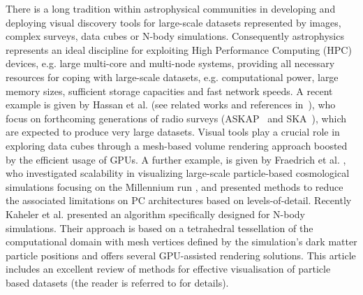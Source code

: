 \documentclass[1p]{elsarticle}
\begin{document}
There is a long tradition within astrophysical communities in developing and deploying visual discovery tools for large-scale datasets represented by images, complex surveys, data cubes or N-body simulations. Consequently astrophysics represents an ideal discipline for exploiting High Performance Computing (HPC) devices, e.g. large multi-core and multi-node systems, providing all necessary resources for coping with large-scale datasets, e.g. computational power, large memory sizes, sufficient storage capacities and fast network speeds. A recent example is given by Hassan et al. (see related works and references in~\cite{2012ASPC..461...45H}), who focus on forthcoming generations of radio surveys (ASKAP~\cite{askap} and SKA~\cite{ska}), which are expected to produce very large datasets. Visual tools play a crucial role in exploring data cubes through a mesh-based volume rendering approach boosted by the efficient usage of GPUs. A further example, is given by Fraedrich et al. \cite{Fraedrich:2009:TMV}, who
investigated scalability in visualizing large-scale particle-based cosmological 
simulations focusing on the Millennium run \cite{millennium}, and presented methods to reduce the associated limitations on PC architectures based on levels-of-detail.
Recently Kaheler et al. \cite{2012arXiv1208.3206K} presented an algorithm specifically designed for N-body simulations. Their approach is based on a tetrahedral tessellation of the computational domain with mesh vertices defined by the simulation's dark matter particle positions and offers several GPU-assisted rendering solutions. This article includes an excellent review of methods for effective visualisation of particle based datasets (the reader is referred to \cite{2012arXiv1208.3206K} for details).
\end{document}

